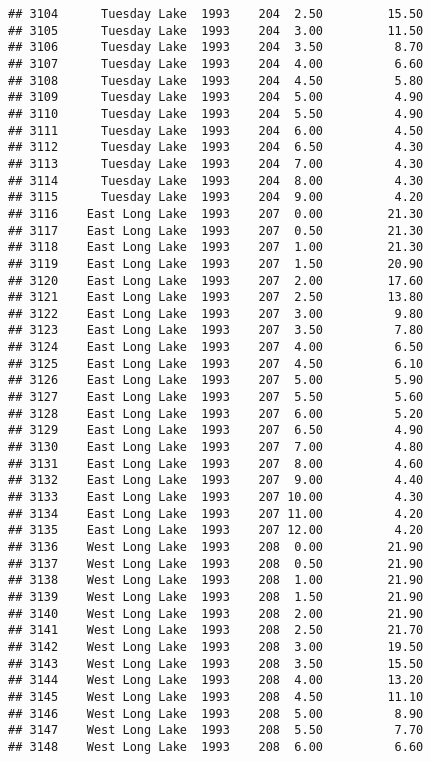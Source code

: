 \documentclass[
]{article}
\begin{document}
\begin{verbatim}
## 3104      Tuesday Lake  1993    204  2.50         15.50
## 3105      Tuesday Lake  1993    204  3.00         11.50
## 3106      Tuesday Lake  1993    204  3.50          8.70
## 3107      Tuesday Lake  1993    204  4.00          6.60
## 3108      Tuesday Lake  1993    204  4.50          5.80
## 3109      Tuesday Lake  1993    204  5.00          4.90
## 3110      Tuesday Lake  1993    204  5.50          4.90
## 3111      Tuesday Lake  1993    204  6.00          4.50
## 3112      Tuesday Lake  1993    204  6.50          4.30
## 3113      Tuesday Lake  1993    204  7.00          4.30
## 3114      Tuesday Lake  1993    204  8.00          4.30
## 3115      Tuesday Lake  1993    204  9.00          4.20
## 3116    East Long Lake  1993    207  0.00         21.30
## 3117    East Long Lake  1993    207  0.50         21.30
## 3118    East Long Lake  1993    207  1.00         21.30
## 3119    East Long Lake  1993    207  1.50         20.90
## 3120    East Long Lake  1993    207  2.00         17.60
## 3121    East Long Lake  1993    207  2.50         13.80
## 3122    East Long Lake  1993    207  3.00          9.80
## 3123    East Long Lake  1993    207  3.50          7.80
## 3124    East Long Lake  1993    207  4.00          6.50
## 3125    East Long Lake  1993    207  4.50          6.10
## 3126    East Long Lake  1993    207  5.00          5.90
## 3127    East Long Lake  1993    207  5.50          5.60
## 3128    East Long Lake  1993    207  6.00          5.20
## 3129    East Long Lake  1993    207  6.50          4.90
## 3130    East Long Lake  1993    207  7.00          4.80
## 3131    East Long Lake  1993    207  8.00          4.60
## 3132    East Long Lake  1993    207  9.00          4.40
## 3133    East Long Lake  1993    207 10.00          4.30
## 3134    East Long Lake  1993    207 11.00          4.20
## 3135    East Long Lake  1993    207 12.00          4.20
## 3136    West Long Lake  1993    208  0.00         21.90
## 3137    West Long Lake  1993    208  0.50         21.90
## 3138    West Long Lake  1993    208  1.00         21.90
## 3139    West Long Lake  1993    208  1.50         21.90
## 3140    West Long Lake  1993    208  2.00         21.90
## 3141    West Long Lake  1993    208  2.50         21.70
## 3142    West Long Lake  1993    208  3.00         19.50
## 3143    West Long Lake  1993    208  3.50         15.50
## 3144    West Long Lake  1993    208  4.00         13.20
## 3145    West Long Lake  1993    208  4.50         11.10
## 3146    West Long Lake  1993    208  5.00          8.90
## 3147    West Long Lake  1993    208  5.50          7.70
## 3148    West Long Lake  1993    208  6.00          6.60

\end{verbatim}
\end{document}

